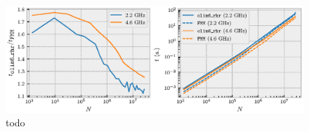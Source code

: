 \documentclass[eikonal.tex]{subfiles}
\begin{document}
\begin{figure}
  \centering
  \includegraphics{speed-comparison.eps}
  \caption{todo}
\end{figure}
\end{document}
